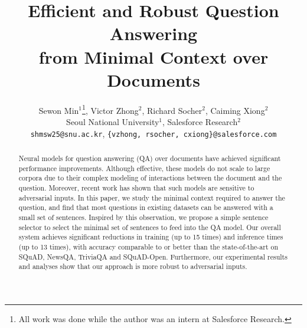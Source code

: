\documentclass[11pt,a4paper]{article}
\title{
Efficient and Robust Question Answering \\
from Minimal Context over Documents }
\author{
	Sewon Min$^{1}$\thanks{All work was done while the author was an intern at Salesforce Research.}, Victor Zhong$^{2}$, Richard Socher$^{2}$, Caiming Xiong$^{2}$ \\
    Seoul National University$^{1}$, Salesforce Research$^{2}$ \\
    {\tt shmsw25@snu.ac.kr}, {\tt \{vzhong, rsocher, cxiong\}@salesforce.com}
}
\date{}
\begin{document}
\maketitle




\begin{abstract}
Neural models for question answering (QA) over documents have achieved significant performance improvements. Although effective, these models do not scale to large corpora due to their complex modeling of interactions between the document and the question. Moreover, recent work has shown that such models are sensitive to adversarial inputs. In this paper, we study the minimal context required to answer the question, and find that most questions in existing datasets can be answered with a small set of sentences. Inspired by this observation, we propose a simple sentence selector to select the minimal set of sentences to feed into the QA model. Our overall system achieves significant reductions in training (up to 15 times) and inference times (up to 13 times), with accuracy comparable to or better than the state-of-the-art on SQuAD, NewsQA, TriviaQA and SQuAD-Open. Furthermore, our experimental results and analyses show that our approach is more robust to adversarial inputs.
\end{abstract}
\end{document}
